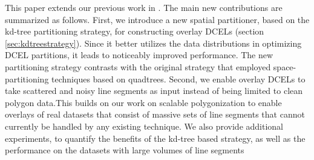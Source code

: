 This paper extends our previous work in \cite{sdcel_paper}. The main new contributions are summarized as follows. First, we introduce a new spatial 
partitioner, based on the kd-tree partitioning strategy, for constructing overlay DCELs (section \ref{sec:kdtreestrategy}). Since it better utilizes the data 
distributions in optimizing DCEL partitions, it leads to noticeably improved performance. The new partitioning strategy contrasts with the original strategy 
that employed space-partitioning techniques based on quadtrees. Second, we enable overlay DCELs to take scattered and noisy line segments as input instead of 
being limited to clean polygon data.This builds on our work on scalable polygonization \cite{LailaMDMPaper} to enable overlays of real datasets that consist of 
massive sets of line segments that cannot currently be handled by any existing technique. We also provide additional experiments, to quantify the benefits of 
the kd-tree based strategy, as well as the performance on the datasets with large volumes of line segments

